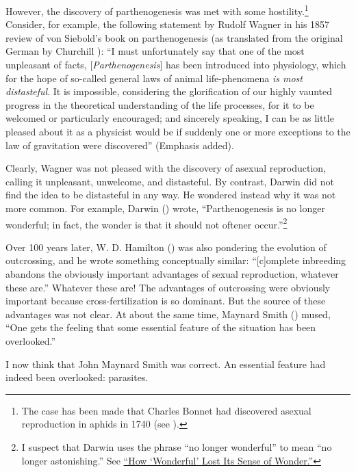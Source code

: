 \documentclass[
  american,
  letterpaper,
]{book}
\begin{document}
However, the discovery of parthenogenesis was met with some
hostility.\footnote{The case has been made that Charles Bonnet had
  discovered asexual reproduction in aphids in 1740 (see
  ).} Consider, for example,
the following statement by Rudolf Wagner in his 1857 review of von
Siebold's book on parthenogenesis (as translated from the original
German by Churchill ): ``I must
unfortunately say that one of the most unpleasant of facts,
{[}\emph{Parthenogenesis}{]} has been introduced into physiology, which
for the hope of so-called general laws of animal life-phenomena \emph{is
most distasteful}. It is impossible, considering the glorification of
our highly vaunted progress in the theoretical understanding of the life
processes, for it to be welcomed or particularly encouraged; and
sincerely speaking, I can be as little pleased about it as a physicist
would be if suddenly one or more exceptions to the law of gravitation
were discovered'' (Emphasis added).

Clearly, Wagner was not pleased with the discovery of asexual
reproduction, calling it unpleasant, unwelcome, and distasteful. By
contrast, Darwin did not find the idea to be distasteful in any way. He
wondered instead why it was not more common. For example, Darwin
() wrote, ``Parthenogenesis is no longer
wonderful; in fact, the wonder is that it should not oftener
occur.''\footnote{I suspect that Darwin uses the phrase ``no longer
  wonderful'' to mean ``no longer astonishing.'' See
  \href{https://www.merriam-webster.com/words-at-play/wonderful-word-history-evolution}{``How
  `Wonderful' Lost Its Sense of Wonder.''}}

Over 100 years later, W. D. Hamilton
() was also pondering the evolution
of outcrossing, and he wrote something conceptually similar:
``{[}c{]}omplete inbreeding abandons the obviously important advantages
of sexual reproduction, whatever these are.'' Whatever these are! The
advantages of outcrossing were obviously important because
cross-fertilization is so dominant. But the source of these advantages
was not clear. At about the same time, Maynard Smith
() mused, ``One gets the feeling that
some essential feature of the situation has been overlooked.''

I now think that John Maynard Smith was correct. An essential feature
had indeed been overlooked: parasites.
\end{document}
